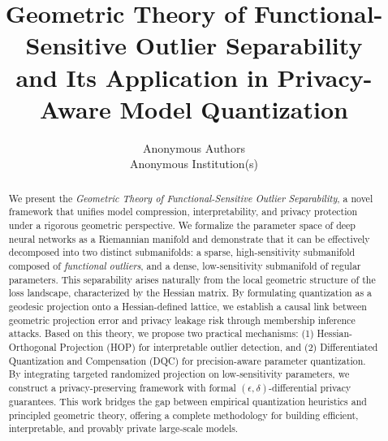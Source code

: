 \documentclass[letterpaper,twocolumn,10pt]{article}
\begin{document}

\date{}

\title{\Large \bf Geometric Theory of Functional-Sensitive Outlier Separability\\
and Its Application in Privacy-Aware Model Quantization}

\author{
{\rm Anonymous Authors}\\
Anonymous Institution(s)
} %

\maketitle

\begin{abstract}
We present the \emph{Geometric Theory of Functional-Sensitive Outlier Separability}, a novel framework that unifies model compression, interpretability, and privacy protection under a rigorous geometric perspective. We formalize the parameter space of deep neural networks as a Riemannian manifold and demonstrate that it can be effectively decomposed into two distinct submanifolds: a sparse, high-sensitivity submanifold composed of \emph{functional outliers}, and a dense, low-sensitivity submanifold of regular parameters. This separability arises naturally from the local geometric structure of the loss landscape, characterized by the Hessian matrix. By formulating quantization as a geodesic projection onto a Hessian-defined lattice, we establish a causal link between geometric projection error and privacy leakage risk through membership inference attacks. Based on this theory, we propose two practical mechanisms: (1) Hessian-Orthogonal Projection (HOP) for interpretable outlier detection, and (2) Differentiated Quantization and Compensation (DQC) for precision-aware parameter quantization. By integrating targeted randomized projection on low-sensitivity parameters, we construct a privacy-preserving framework with formal $(\epsilon, \delta)$-differential privacy guarantees. This work bridges the gap between empirical quantization heuristics and principled geometric theory, offering a complete methodology for building efficient, interpretable, and provably private large-scale models.
\end{abstract}
\end{document}
